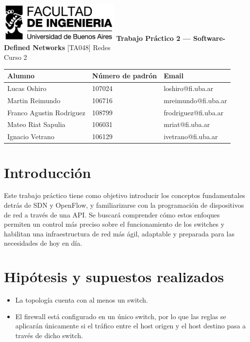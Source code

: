 \documentclass[titlepage,a4paper]{article}
\begin{document}
\begin{titlepage} %
    \hfill\includegraphics[width=6cm]{img/logofiuba.jpg}
    \centering
    \vfill
    \Huge \textbf{Trabajo Práctico 2 —  Software-Defined Networks}
    \vskip2cm
    \Large [TA048] Redes \\
    Curso 2 \\ 
    \vfill
    \begin{tabular}{ | l | l | l |}
      \hline
      Alumno & Número de padrón & Email \\ \hline
      Lucas Oshiro & 107024 & loshiro@fi.uba.ar \\ \hline
      Martin Reimundo & 106716 & mreimundo@fi.uba.ar \\ \hline
      Franco Agustin Rodriguez & 108799 & frodriguez@fi.uba.ar \\ \hline
      Mateo Riat Sapulia & 106031 & mriat@fi.uba.ar \\ \hline
      Ignacio Vetrano & 106129 & ivetrano@fi.uba.ar \\ \hline
    \end{tabular}
    \vfill
    \vfill
\end{titlepage}

\tableofcontents %
\newpage

\section{Introducción}\label{sec:intro}

    Este trabajo práctico tiene como objetivo introducir los conceptos fundamentales detrás de SDN y OpenFlow, y familiarizarse con la programación de dispositivos de red a través de una API. Se buscará comprender cómo estos enfoques permiten un control más preciso sobre el funcionamiento de los switches y habilitan una infraestructura de red más ágil, adaptable y preparada para las necesidades de hoy en día.



\section{Hipótesis y supuestos realizados}\label{sec:supuestos}

    \begin{itemize}
        \item La topología cuenta con al menos un switch. \\

        \item El firewall está configurado en un único switch, por lo que las reglas se aplicarán únicamente si el tráfico entre el host origen y el host destino pasa a través de dicho switch.
    \end{itemize}
    
\end{document}

